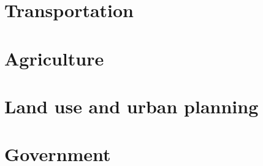 \documentclass{book}\usepackage[]{graphicx}\usepackage[]{color}
\begin{document}
\chapter{Transportation}
\label{chap:transportation}





\cleardoublepage
    

\chapter{Agriculture}
\label{chap:agriculture}





\cleardoublepage
    

\chapter{Land use and urban planning}
\label{chap:land_use_urban_planning}





\cleardoublepage
    

\chapter{Government}
\label{chap:government}





\cleardoublepage
    
\end{document}
